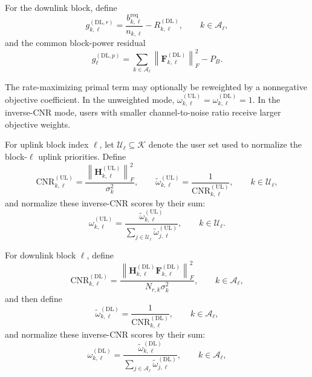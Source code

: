 \documentclass[11pt]{article}
\newcommand{\Kset}{\mathcal{K}}
\newcommand{\Aset}{\mathcal{A}}
\newcommand{\Hc}{\mathbf{H}}
\newcommand{\F}{\mathbf{F}}
\newcommand{\norm}[1]{\left\lVert #1 \right\rVert}
\newcommand{\UL}{\mathrm{UL}}
\newcommand{\DL}{\mathrm{DL}}
\newcommand{\CNR}{\mathrm{CNR}}
\begin{document}
For the downlink block, define
\begin{equation}
g_{k,\ell}^{(\DL,r)}
=
\frac{b_{k,\ell}^{\mathrm{req}}}{n_{k,\ell}} - R_{k,\ell}^{(\DL)},
\qquad k\in\Aset_\ell,
\label{eq:dl-rate-residual}
\end{equation}
and the common block-power residual
\begin{equation}
g_{\ell}^{(\DL,p)}
=
\sum_{k\in\Aset_\ell}\norm{\F_{k,\ell}^{(\DL)}}_F^2 - P_B.
\label{eq:dl-power-residual}
\end{equation}

The rate-maximizing primal term may
optionally be reweighted by a nonnegative objective coefficient. In the
unweighted mode,
$\omega_{k,\ell}^{(\UL)}=\omega_{k,\ell}^{(\DL)}=1$. In the inverse-CNR mode,
users with smaller channel-to-noise ratio receive larger objective weights.

For uplink block index $\ell$, let $\mathcal{U}_\ell\subseteq\Kset$ denote the
user set used to normalize the block-$\ell$ uplink priorities. Define
\begin{equation}
\CNR_{k,\ell}^{(\UL)}
=
\frac{\norm{\Hc_{k,\ell}^{(\UL)}}_F^2}{\sigma_k^2},
\qquad
\widetilde{\omega}_{k,\ell}^{(\UL)}
=
\frac{1}{\CNR_{k,\ell}^{(\UL)}},
\qquad
k\in\mathcal{U}_\ell,
\label{eq:ul-inverse-cnr-raw}
\end{equation}
and normalize these inverse-CNR scores by their sum:
\begin{equation}
\omega_{k,\ell}^{(\UL)}
=
\frac{\widetilde{\omega}_{k,\ell}^{(\UL)}}{
\sum_{j\in\mathcal{U}_\ell}\widetilde{\omega}_{j,\ell}^{(\UL)}
},
\qquad
k\in\mathcal{U}_\ell.
\label{eq:ul-inverse-cnr-weight}
\end{equation}

For downlink block $\ell$, define
\begin{equation}
\CNR_{k,\ell}^{(\DL)}
=
\frac{
\norm{\Hc_{k,\ell}^{(\DL)}\F_{k,\ell}^{(\DL)}}_F^2
}{
N_{r,k}\sigma_k^2
},
\qquad
k\in\Aset_\ell,
\end{equation}
and then define
\begin{equation}
\widetilde{\omega}_{k,\ell}^{(\DL)}
=
\frac{1}{\CNR_{k,\ell}^{(\DL)}},
\qquad
k\in\Aset_\ell,
\label{eq:dl-inverse-cnr-raw}
\end{equation}
and normalize these inverse-CNR scores by their sum:
\begin{equation}
\omega_{k,\ell}^{(\DL)}
=
\frac{\widetilde{\omega}_{k,\ell}^{(\DL)}}{
\sum_{j\in\Aset_\ell}\widetilde{\omega}_{j,\ell}^{(\DL)}
},
\qquad
k\in\Aset_\ell,
\label{eq:dl-inverse-cnr-weight}
\end{equation}
\end{document}

